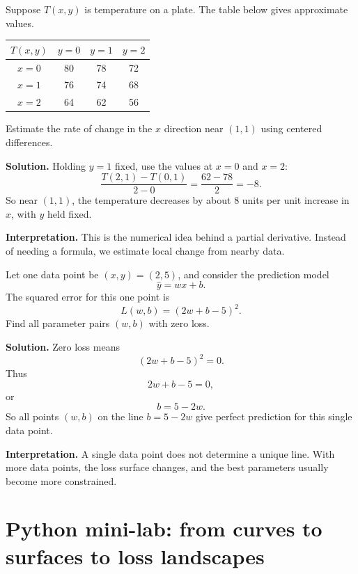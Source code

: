 \begin{examplebox}[title={3. From a table to partial rates of change}]
Suppose $T(x,y)$ is temperature on a plate. The table below gives approximate values.

\begin{center}
\begin{tabular}{c|ccc}
\toprule
$T(x,y)$ & $y=0$ & $y=1$ & $y=2$\\
\midrule
$x=0$ & 80 & 78 & 72\\
$x=1$ & 76 & 74 & 68\\
$x=2$ & 64 & 62 & 56\\
\bottomrule
\end{tabular}
\end{center}

Estimate the rate of change in the $x$ direction near $(1,1)$ using centered differences.

\textbf{Solution.}
Holding $y=1$ fixed, use the values at $x=0$ and $x=2$:
\[
  \frac{T(2,1)-T(0,1)}{2-0}
  =\frac{62-78}{2}
  =-8.
\]
So near $(1,1)$, the temperature decreases by about $8$ units per unit increase in $x$, with $y$ held fixed.

\textbf{Interpretation.} This is the numerical idea behind a partial derivative. Instead of needing a formula, we estimate local change from nearby data.
\end{examplebox}

\begin{examplebox}[title={4. A loss function as a multivariable function}]
Let one data point be $(x,y)=(2,5)$, and consider the prediction model
\[
  \widehat y=wx+b.
\]
The squared error for this one point is
\[
  L(w,b)=(2w+b-5)^2.
\]
Find all parameter pairs $(w,b)$ with zero loss.

\textbf{Solution.}
Zero loss means
\[
  (2w+b-5)^2=0.
\]
Thus
\[
  2w+b-5=0,
\]
or
\[
  b=5-2w.
\]
So all points $(w,b)$ on the line $b=5-2w$ give perfect prediction for this single data point.

\textbf{Interpretation.} A single data point does not determine a unique line. With more data points, the loss surface changes, and the best parameters usually become more constrained.
\end{examplebox}

\section{Python mini-lab: from curves to surfaces to loss landscapes}

